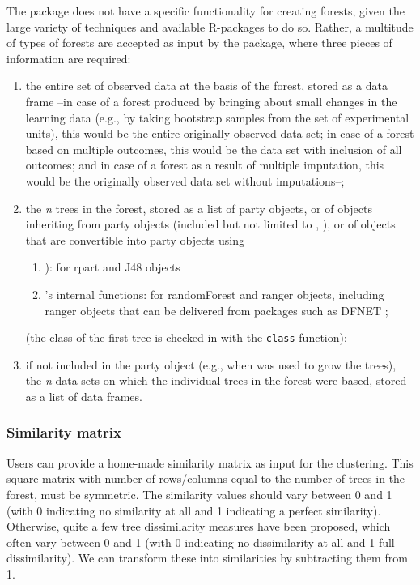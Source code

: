 The  package does not have a specific functionality for creating forests, given the large variety of techniques and available R-packages to do so. Rather, a multitude of types of forests are accepted as input by the package, where three pieces of information are required:
\begin{enumerate}
    \item the entire set of observed data at the basis of the forest, stored as a data frame --in case of a forest produced by bringing about small changes in the learning data (e.g., by taking bootstrap samples from the set of experimental units), this would be the entire originally observed data set; in case of a forest based on multiple outcomes, this would be the data set with inclusion of all outcomes; and in case of a forest as a result of multiple imputation, this would be the originally observed data set without imputations--; 
    \item the \textit{n} trees in the forest, stored as a list of party objects, or of objects inheriting from party objects (included but not limited to , ), or of objects that are convertible into party objects using 
    \begin{enumerate}
        \item {} \citep{Hothornb2015}): for rpart and J48 objects
        \item {}'s internal functions: for randomForest and ranger objects, including ranger objects that can be delivered from  packages such as DFNET \citep{Pfeifer2022};
    \end{enumerate}
    (the class of the first tree is checked in  with the \texttt{class} function); 
    \item if not included in the party object (e.g., when  was used to grow the trees), the \textit{n} data sets on which the individual trees in the forest were based, stored as a list of data frames. 
\end{enumerate}


\subsubsection{Similarity matrix}
Users can provide a home-made similarity matrix as input for the clustering. This square matrix with number of rows/columns  equal to the number of trees in the forest,  must be symmetric. The similarity values should vary between 0 and 1 (with 0 indicating no similarity at all and 1 indicating a perfect similarity). Otherwise, quite a few tree dissimilarity measures have been proposed, which often vary between 0 and 1 (with 0 indicating no dissimilarity at all and 1 full dissimilarity). We can transform these into similarities by subtracting them from 1.

